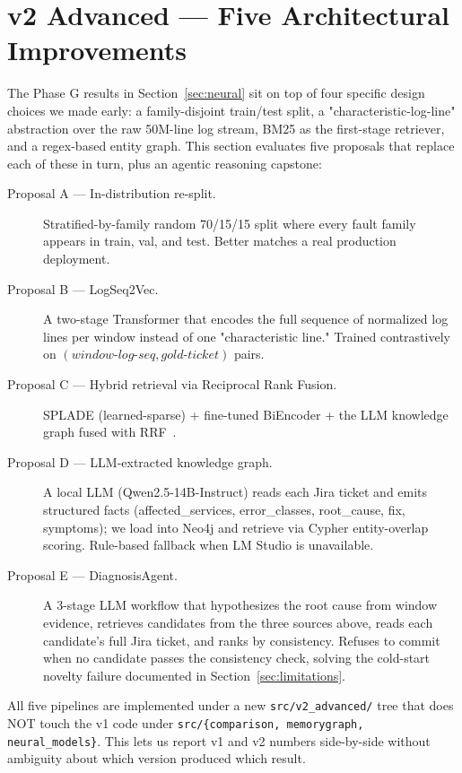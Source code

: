 \section{v2 Advanced — Five Architectural Improvements}
\label{sec:v2}

The Phase G results in Section~\ref{sec:neural} sit on top of four
specific design choices we made early: a family-disjoint train/test
split, a "characteristic-log-line" abstraction over the raw 50M-line
log stream, BM25 as the first-stage retriever, and a regex-based
entity graph. This section evaluates five proposals that replace
each of these in turn, plus an agentic reasoning capstone:

\begin{description}
    \item[Proposal A — In-distribution re-split.] Stratified-by-family
    random 70/15/15 split where every fault family appears in train,
    val, and test. Better matches a real production deployment.
    \item[Proposal B — LogSeq2Vec.] A two-stage Transformer that
    encodes the full sequence of normalized log lines per window
    instead of one "characteristic line." Trained contrastively on
    $(\textit{window-log-seq}, \textit{gold-ticket})$ pairs.
    \item[Proposal C — Hybrid retrieval via Reciprocal Rank Fusion.]
    SPLADE (learned-sparse) + fine-tuned BiEncoder + the LLM
    knowledge graph fused with RRF~\cite{cormack2009rrf}.
    \item[Proposal D — LLM-extracted knowledge graph.] A local LLM
    (Qwen2.5-14B-Instruct) reads each Jira ticket and emits
    structured facts (affected\_services, error\_classes,
    root\_cause, fix, symptoms); we load into Neo4j and retrieve
    via Cypher entity-overlap scoring. Rule-based fallback when
    LM Studio is unavailable.
    \item[Proposal E — DiagnosisAgent.] A 3-stage LLM workflow that
    hypothesizes the root cause from window evidence, retrieves
    candidates from the three sources above, reads each candidate's
    full Jira ticket, and ranks by consistency. Refuses to commit
    when no candidate passes the consistency check, solving the
    cold-start novelty failure documented in Section~\ref{sec:limitations}.
\end{description}

All five pipelines are implemented under a new \texttt{src/v2\_advanced/}
tree that does NOT touch the v1 code under \texttt{src/\{comparison,
memorygraph, neural\_models\}}. This lets us report v1 and v2 numbers
side-by-side without ambiguity about which version produced which
result.

